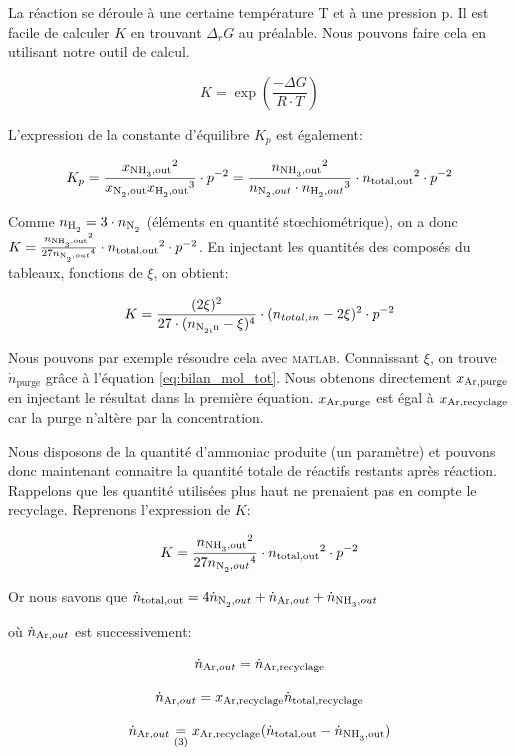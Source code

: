 \documentclass[a4paper, oneside, 12pt]{article}
\begin{document}
La réaction se déroule à une certaine température T et à une pression p. 
Il est facile de calculer $K$ en trouvant $\Delta_r G$ au préalable. 
Nous pouvons faire cela en utilisant notre outil de calcul.

\[
K=\exp{\left(\frac{-\Delta G}{R \cdot T}\right)}\]

L'expression de la constante d'équilibre $K_p$ est également: 

\[
K_p=\frac{{x_{\ce{NH3},\text{out}}}^2}{x_{\ce{N2},\text{out}}{x_{\ce{H2},\text{out}}}^3} \cdot p^{-2} = 
\frac{{n_{\ce{NH3},\text{out}}}^2}{n_{\ce{N2},out}\cdot {n_{\ce{H2},out}}^3}\cdot {n_{\text{total,out}}}^2\cdot p^{-2}
\]

Comme $n_{\ce{H2}}=3\cdot n_{\ce{N2}}$ (éléments en quantité stœchiométrique), 
on a donc 
$K=\frac{{n_{\ce{NH3},\text{out}}}^2}{27{n_{\ce{N2},out}}^4} \cdot
{n_{\text{total,out}}}^2\cdot p^{-2}$. 
En injectant les quantités des composés du tableaux, fonctions de $\xi$, on obtient:

\[ 
K = 
\frac{({2\xi})^2}{27 \cdot ({{n_{\ce{N2,in}}-\xi})^4}} \cdot
({n_{total,in}-2\xi})^2 \cdot p^{-2} 
\]

Nous pouvons par exemple résoudre cela avec \textsc{matlab}. 
Connaissant $\xi$, on trouve $\dot{n}_{\text{purge}}$
grâce à l'équation \ref{eq:bilan_mol_tot}. 
Nous obtenons directement $x_{\ce{Ar},\text{purge}}$ en injectant 
le résultat dans la première équation. 
$x_{\ce{Ar},\text{purge}}$ est égal à $x_{\ce{Ar},\text{recyclage}}$ 
car la purge n'altère par la concentration.

Nous disposons de la quantité d'ammoniac produite (un paramètre) 
et pouvons donc maintenant connaitre la quantité totale de réactifs restants après réaction. 
Rappelons que les quantité utilisées plus haut ne prenaient pas en compte le recyclage. 
Reprenons l'expression de $K$: 

\[ 
K = 
\frac{{n_{\ce{NH3},\text{out}}}^2}{27{n_{\ce{N2},out}}^4} \cdot 
{n_{\text{total,out}}}^2\cdot p^{-2}
\]

Or nous savons que $\dot{n}_{\text{total,out}} = 
4\dot{n}_{\ce{N2},out}+\dot{n}_{\ce{Ar},out}+\dot{n}_{\ce{NH3},out}$ 

où $\dot{n}_{\ce{Ar},out}$ est successivement:

\[\dot{n}_{\ce{Ar},out}=\dot{n}_{\ce{Ar},\text{recyclage}}\]

\[ \dot{n}_{\ce{Ar},out}=x_{\ce{Ar},\text{recyclage}}\dot{n}_{\text{total,recyclage}} \]

\[ 
\dot{n}_{\ce{Ar},out}\underset{(3)} = 
x_{\ce{Ar},\text{recyclage}}(\dot{n}_{\text{total,out}}-\dot{n}_{\ce{NH3},\text{out}}) 
\]
\end{document}
